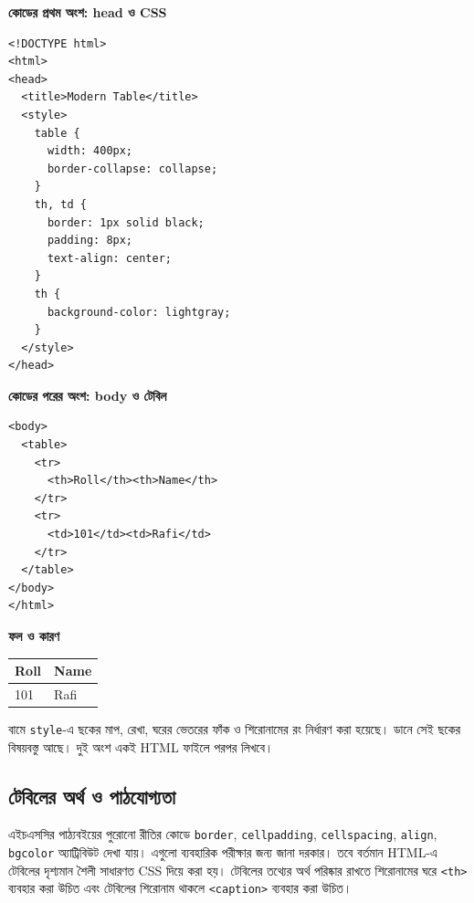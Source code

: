 \par\noindent
\begin{minipage}[t]{.50\linewidth}\vspace{0pt}\small
{\bfseries\color{chFourTeal}কোডের প্রথম অংশ: head ও CSS}\par
\begin{verbatim}
<!DOCTYPE html>
<html>
<head>
  <title>Modern Table</title>
  <style>
    table {
      width: 400px;
      border-collapse: collapse;
    }
    th, td {
      border: 1px solid black;
      padding: 8px;
      text-align: center;
    }
    th {
      background-color: lightgray;
    }
  </style>
</head>
\end{verbatim}
\end{minipage}\hfill
\begin{minipage}[t]{.46\linewidth}\vspace{0pt}\small
{\bfseries\color{chFourTeal}কোডের পরের অংশ: body ও টেবিল}\par
\begin{verbatim}
<body>
  <table>
    <tr>
      <th>Roll</th><th>Name</th>
    </tr>
    <tr>
      <td>101</td><td>Rafi</td>
    </tr>
  </table>
</body>
</html>
\end{verbatim}
\textbf{\color{chFourTeal}ফল ও কারণ}\par
\begin{tabular}{|l|l|}\hline
\rowcolor{lightgray}\textbf{Roll} & \textbf{Name} \\\hline
101 & Rafi \\\hline\end{tabular}\par\smallskip
বামে \texttt{style}-এ ছকের মাপ, রেখা, ঘরের ভেতরের ফাঁক ও শিরোনামের রং নির্ধারণ করা হয়েছে। ডানে সেই ছকের বিষয়বস্তু আছে। দুই অংশ একই HTML ফাইলে পরপর লিখবে।
\end{minipage}\par\smallskip


\subsection{টেবিলের অর্থ ও পাঠযোগ্যতা}

এইচএসসির পাঠ্যবইয়ের পুরোনো রীতির কোডে \texttt{border}, \texttt{cellpadding}, \texttt{cellspacing}, \texttt{align}, \texttt{bgcolor} অ্যাট্রিবিউট দেখা যায়। এগুলো ব্যবহারিক পরীক্ষার জন্য জানা দরকার। তবে বর্তমান HTML-এ টেবিলের দৃশ্যমান শৈলী সাধারণত CSS দিয়ে করা হয়। টেবিলের তথ্যের অর্থ পরিষ্কার রাখতে শিরোনামের ঘরে \texttt{<th>} ব্যবহার করা উচিত এবং টেবিলের শিরোনাম থাকলে \texttt{<caption>} ব্যবহার করা উচিত।

